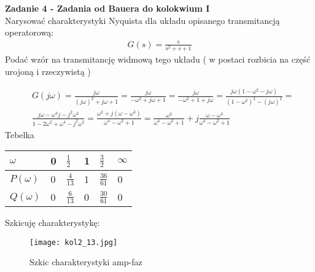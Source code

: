 \documentclass[a4paper,11pt]{article}
\begin{document}
\newpage
\begin{framed}
\textbf{Zadanie 4 - Zadania od Bauera do kolokwium I } \\ 
Narysować charakterystyki Nyquista dla układu opisanego transmitancją operatorową:
\begin{align*}
G(s)=\frac{s}{s^{2}+s+1}
\end{align*}
Podać wzór na transmitancję widmową tego układu ( w postaci rozbicia na część urojoną i rzeczywistą )
\end{framed}
\begin{align*}
&G(j\omega)=\frac{j\omega}{(j\omega )^{2}+j\omega + 1} = \frac{j\omega}{-\omega ^{2}+j\omega + 1}=\frac{j\omega}{-\omega ^{2}+1+j\omega}=\frac{j\omega(1-\omega ^{2}-j\omega)}{(1-\omega ^{2})^{2}-(j\omega )^{2}}= \\
&\frac{j\omega -\omega ^{3}j-j^{2}\omega ^{2}}{1-2\omega ^{2}+\omega ^{4}-j^{2}\omega ^{2}}=\frac{\omega ^{2}+j(\omega-\omega ^{3})}{\omega ^{4}- \omega^{2} + 1}=\frac{\omega ^{2}}{\omega ^{4}-\omega ^{2}+1}+j \frac{\omega - \omega ^{3}}{\omega ^{4} - \omega ^{2} + 1}
\end{align*}
Tebelka
\begin{table}[H]
\begin{center}
\begin{tabular}{|p{2cm}|p{2cm}|p{2cm}|p{2cm}|p{2cm}|p{2cm}|}
\hline
\( \omega \) & 0 & \( \frac{1}{2} \) & 1 & \(\frac{3}{2}\) & \( \infty\)  \\ \hline
\( P(\omega) \) & 0 & \( \frac{4}{13} \) & 1 & \( \frac{36}{61} \) & 0  \\ \hline
\( Q(\omega) \) & 0 & \( \frac{6}{13} \) & 0 & \( \frac{30}{61} \) & 0  \\ \hline
\end{tabular}
\end{center}
\end{table}
Szkicuję charakterystykę:
\begin{figure}[H]
\centerline{\texttt{[image: kol2\_13.jpg]}}
\caption{Szkic charakterystyki amp-faz}
\label{fig:kol2_13}
\end{figure}
\end{document}
